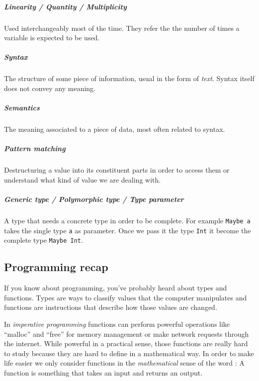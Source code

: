 \documentclass[
]{article}
\begin{document}
\hypertarget{linearity-quantity-multiplicity}{%
\subparagraph{Linearity / Quantity /
Multiplicity}\label{linearity-quantity-multiplicity}}

Used interchangeably most of the time. They refer the the number of
times a variable is expected to be used.

\hypertarget{syntax}{%
\subparagraph{Syntax}\label{syntax}}

The structure of some piece of information, usual in the form of
\emph{text}. Syntax itself does not convey any meaning.

\hypertarget{semantics}{%
\subparagraph{Semantics}\label{semantics}}

The meaning associated to a piece of data, most often related to syntax.

\hypertarget{pattern-matching}{%
\subparagraph{Pattern matching}\label{pattern-matching}}

Destructuring a value into its constituent parts in order to access them
or understand what kind of value we are dealing with.

\hypertarget{generic-type-polymorphic-type-type-parameter}{%
\subparagraph{Generic type / Polymorphic type / Type
parameter}\label{generic-type-polymorphic-type-type-parameter}}

A type that needs a concrete type in order to be complete. For example
\texttt{Maybe\ a} takes the single type \texttt{a} as parameter. Once we
pass it the type \texttt{Int} it become the complete type
\texttt{Maybe\ Int}.

\hypertarget{programming-recap}{%
\subsection{Programming recap}\label{programming-recap}}

If you know about programming, you've probably heard about types and
functions. Types are ways to classify values that the computer
manipulates and functions are instructions that describe how those
values are changed.

In \emph{imperative programming} functions can perform powerful
operations like ``malloc'' and ``free'' for memory management or make
network requests through the internet. While powerful in a practical
sense, those functions are really hard to study because they are hard to
define in a mathematical way. In order to make life easier we only
consider functions in the \emph{mathematical} sense of the word : A
function is something that takes an input and returns an output.
\end{document}

